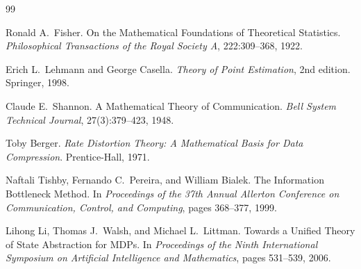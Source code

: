 \documentclass[11pt]{article}
\begin{document}
\begin{thebibliography}{99}

Ronald A.\ Fisher.
\newblock On the Mathematical Foundations of Theoretical Statistics.
\newblock \emph{Philosophical Transactions of the Royal Society A}, 222:309--368, 1922.

Erich L.\ Lehmann and George Casella.
\newblock \emph{Theory of Point Estimation}, 2nd edition.
\newblock Springer, 1998.

Claude E.\ Shannon.
\newblock A Mathematical Theory of Communication.
\newblock \emph{Bell System Technical Journal}, 27(3):379--423, 1948.

Toby Berger.
\newblock \emph{Rate Distortion Theory: A Mathematical Basis for Data Compression}.
\newblock Prentice-Hall, 1971.

Naftali Tishby, Fernando C.\ Pereira, and William Bialek.
\newblock The Information Bottleneck Method.
\newblock In \emph{Proceedings of the 37th Annual Allerton Conference on Communication, Control, and Computing}, pages 368--377, 1999.

Lihong Li, Thomas J.\ Walsh, and Michael L.\ Littman.
\newblock Towards a Unified Theory of State Abstraction for MDPs.
\newblock In \emph{Proceedings of the Ninth International Symposium on Artificial Intelligence and Mathematics}, pages 531--539, 2006.

\end{thebibliography}
\end{document}
